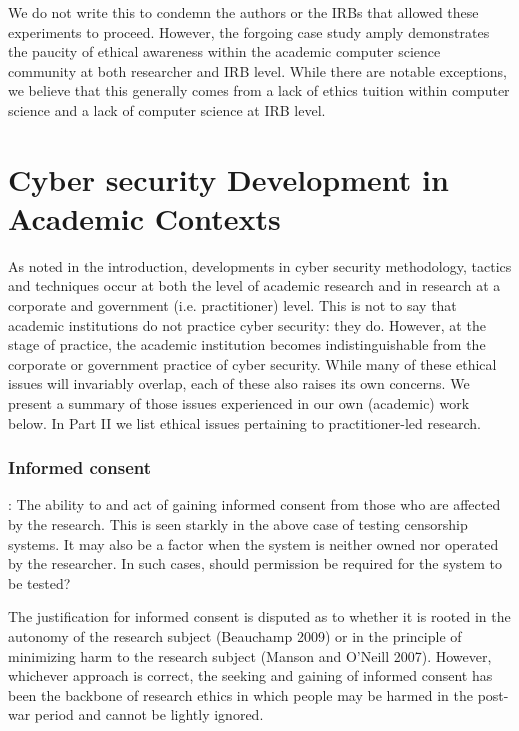 \documentclass{svjour3}                     %
\begin{document}
We do not write this to condemn the authors or the IRBs that allowed these experiments to proceed. However, the forgoing case study amply demonstrates the paucity of ethical awareness within the academic computer science community at both researcher and IRB level. While there are notable exceptions, we believe that this generally comes from a lack of ethics tuition within computer science and a lack of computer science at IRB level.


\section{Cyber security Development in Academic Contexts}
\label{sec:academicdev}
As noted in the introduction, developments in cyber security methodology, tactics and techniques occur at both the level of academic research and in research at a corporate and government (i.e. practitioner) level.  This is not to say that academic institutions do not practice cyber security: they do. However, at the stage of practice, the academic institution becomes indistinguishable from the corporate or government practice of cyber security. While many of these ethical issues will invariably overlap, each of these also raises its own concerns. We present a summary of those issues experienced in our own (academic) work below. In Part II we list ethical issues pertaining to practitioner-led research.

\subsubsection{Informed consent}:
The ability to and act of gaining informed consent from those who are affected by the research.  This is seen starkly in the above case of testing censorship systems. It may also be a factor when the system is neither owned nor operated by the researcher. In such cases, should permission be required for the system to be tested?

The justification for informed consent is disputed as to whether it is rooted in the autonomy of the research subject (Beauchamp 2009) or in the principle of minimizing harm to the research subject (Manson and O’Neill 2007). However, whichever approach is correct, the seeking and gaining of informed consent has been the backbone of research ethics in which people may be harmed in the post-war period and cannot be lightly ignored.
\end{document}
